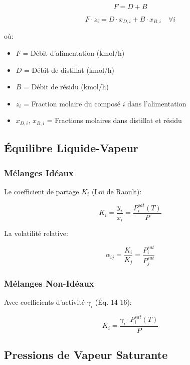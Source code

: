 \documentclass[11pt,a4paper]{article}
\begin{document}
\begin{equation}
F = D + B
\end{equation}

\begin{equation}
F \cdot z_i = D \cdot x_{D,i} + B \cdot x_{B,i} \quad \forall i
\end{equation}

où:
\begin{itemize}[leftmargin=*]
    \item $F$ = Débit d'alimentation (kmol/h)
    \item $D$ = Débit de distillat (kmol/h)
    \item $B$ = Débit de résidu (kmol/h)
    \item $z_i$ = Fraction molaire du composé $i$ dans l'alimentation
    \item $x_{D,i}$, $x_{B,i}$ = Fractions molaires dans distillat et résidu
\end{itemize}

\subsection{Équilibre Liquide-Vapeur}

\subsubsection{Mélanges Idéaux}

Le coefficient de partage $K_i$ (Loi de Raoult):

\begin{equation}
K_i = \frac{y_i}{x_i} = \frac{P_i^{sat}(T)}{P}
\end{equation}

La volatilité relative:

\begin{equation}
\alpha_{ij} = \frac{K_i}{K_j} = \frac{P_i^{sat}}{P_j^{sat}}
\end{equation}

\subsubsection{Mélanges Non-Idéaux}

Avec coefficients d'activité $\gamma_i$ (Éq. 14-16):

\begin{equation}
K_i = \frac{\gamma_i \cdot P_i^{sat}(T)}{P}
\end{equation}

\subsection{Pressions de Vapeur Saturante}
\end{document}
